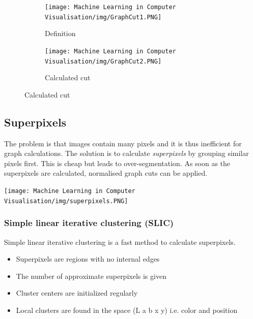 \documentclass[x11names,11pt,a4paper]{article}
\theoremstyle{definition}
\begin{document}
\begin{figure}[H]
     \centering
     \begin{subfigure}[b]{0.45\textwidth}
         \centering
         \texttt{[image: Machine Learning in Computer Visualisation/img/GraphCut1.PNG]}
         \caption{Definition}
     \end{subfigure}
     \hfill
     \begin{subfigure}[b]{0.45\textwidth}
         \centering
         \texttt{[image: Machine Learning in Computer Visualisation/img/GraphCut2.PNG]}
         \caption{Calculated cut}
     \end{subfigure}
\end{figure}


\subsection{Superpixels}
The problem is that images contain many pixels and it is thus inefficient for graph calculations. The solution is to calculate \emph{superpixels} by grouping similar pixels first. This is cheap but leads to over-segmentation. As soon as the superpixels are calculated, normalised graph cuts can be applied.
\begin{center}
	\texttt{[image: Machine Learning in Computer Visualisation/img/superpixels.PNG]}
\end{center}

\subsubsection{Simple linear iterative clustering (SLIC)}
Simple linear iterative clustering is a fast method to calculate superpixels.
\begin{itemize}
    \item Superpixels are regions with no internal edges
    \item The number of approximate superpixels is given
    \item Cluster centers are initialized regularly
    \item Local clusters are found in the space (L a b x y) i.e. color and position
\end{itemize}
\end{document}
